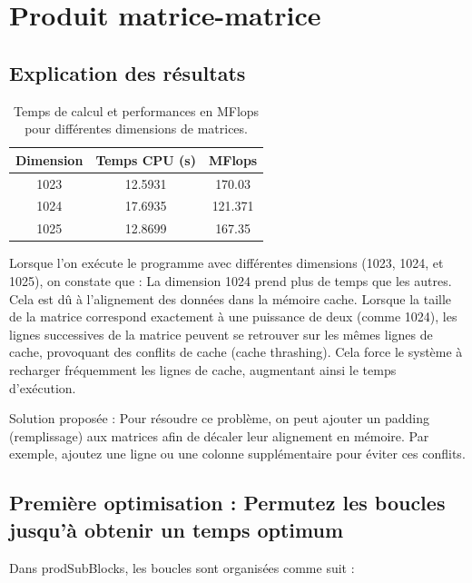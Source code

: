 \documentclass[a4paper,13pt]{book}
\author{\bsc{DADA SIMEU Cédric Darel}}
\begin{document}
	
\tableofcontents
\listoffigures
\newpage
\section{Produit matrice-matrice}
\subsection{Explication des résultats} 
\begin{table}[h!]
    \begin{center}
    \begin{tabular}{|c|c|c|}
        \hline
        Dimension & Temps CPU (s) & MFlops \\ \hline
        1023      & 12.5931       & 170.03 \\ \hline
        1024      & 17.6935       & 121.371 \\ \hline
        1025      & 12.8699       & 167.35 \\ \hline
    \end{tabular}
    \caption{Temps de calcul et performances en MFlops pour différentes dimensions de matrices.}
    \label{tab:perf_matrix}
\end{center}
\end{table}

Lorsque l'on exécute le programme avec différentes dimensions (1023, 1024, et 1025), on constate que : La dimension 1024  prend plus de temps que les autres.
    Cela est dû à l'alignement des données dans la mémoire cache. Lorsque la taille de la matrice correspond exactement à une puissance de deux (comme 1024), les lignes successives de la matrice peuvent se retrouver sur les mêmes lignes de cache, provoquant des conflits de cache (cache thrashing). Cela force le système à recharger fréquemment les lignes de cache, augmentant ainsi le temps d'exécution.
     

Solution proposée : 
Pour résoudre ce problème, on peut ajouter un padding (remplissage) aux matrices afin de décaler leur alignement en mémoire. Par exemple, ajoutez une ligne ou une colonne supplémentaire pour éviter ces conflits. 

\subsection{Première optimisation : Permutez les boucles jusqu’à obtenir un temps optimum }
  
Dans prodSubBlocks, les boucles sont organisées comme suit : 
\end{document}
